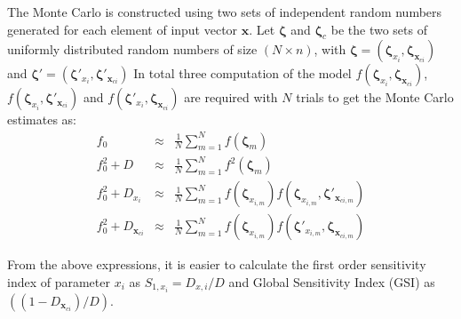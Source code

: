 The Monte Carlo is constructed using two sets of independent random numbers generated for each element of input vector $\mathbf{x}$.  Let $\boldsymbol{\zeta}$ and $\boldsymbol{\zeta}_c$ be the two sets of uniformly distributed random numbers of size $ (N \times n)$, with $\boldsymbol{\zeta} = (\boldsymbol{\zeta}_{x_i},\boldsymbol{\zeta}_{\mathbf{x}_{ci}})$ and $\boldsymbol{\zeta}' = (\boldsymbol{\zeta}'_{x_i},\boldsymbol{\zeta}'_{\mathbf{x}_{ci}})$     In total three computation of the model $f{(\boldsymbol{\zeta}_{x_i},\boldsymbol{\zeta}_{\mathbf{x}_{ci}})}$, $f{(\boldsymbol{\zeta}_{x_i},\boldsymbol{\zeta}'_{\mathbf{x}_{ci}})}$ and $f{(\boldsymbol{\zeta}'_{x_i},\boldsymbol{\zeta}_{\mathbf{x}_{ci}})}$ are required with $N$ trials to get the Monte Carlo estimates  as:
\begin{eqnarray}
\label{eq:MC_Disc}
 {f_0} & \approx & {\frac{1}{N}}\sum\limits_{m=1}^{N}{f(\boldsymbol{\zeta}_m)} \\
 {f_0^2}+D & \approx & {\frac{1}{N}}\sum\limits_{m=1}^{N}{f^2(\boldsymbol{\zeta}_m)} \\
 {f_0^2}+D_{x_i} &\approx& {\frac{1}{N}}\sum\limits_{m=1}^{N}f{(\boldsymbol{\zeta}_{x_{i,m}})}f{(\boldsymbol{\zeta}_{x_{i,m}},\boldsymbol{\zeta}'_{\mathbf{x}_{ci,m}})} \\
 {f_0^2}+D_{\mathbf{x}_{ci}} &\approx& {\frac{1}{N}}\sum\limits_{m=1}^{N}f{(\boldsymbol{\zeta}_{x_{i,m}})}f{(\boldsymbol{\zeta}'_{x_{i,m}},\boldsymbol{\zeta}_{\mathbf{x}_{ci,m}})}
\end{eqnarray}

From the above expressions, it is easier to calculate the first order sensitivity index of parameter $x_i$ as $S_{1,x_i}=D_{x,i}/D$ and Global Sensitivity Index (GSI) as $((1-D_{\mathbf{x}_{ci}})/D)$.


